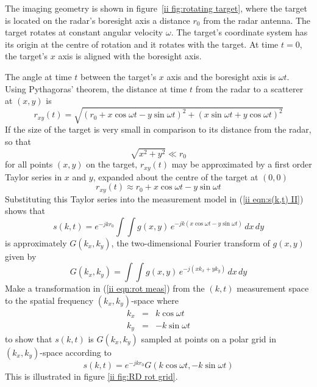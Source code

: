The imaging geometry is shown in figure~\ref{ii fig:rotating target}, where
the target is located on the radar's boresight axis a distance $r_0$ from
the radar antenna.  The target rotates at constant angular velocity
$\omega$.  The target's coordinate system has its origin at the centre of
rotation and it rotates with the target.  At time $t=0$, the target's $x$ 
axis is aligned with the boresight axis.  

The angle at time $t$ between the target's $x$ axis and the boresight axis 
is $\omega t$.  Using Pythagoras' theorem, the distance at time $t$ 
from the radar to a scatterer at $(x,y)$ is
\begin{equation}\label{ii eqn:rxy(t) rot}
r_{xy}(t)=\sqrt{(r_0+x\cos\omega t-y\sin\omega t)^2
+(x\sin\omega t+y\cos\omega t)^2}
\end{equation}
If the size of the target is very small in comparison to its distance from
the radar, so that
\begin{equation}\label{ii eqn:size condition}
\sqrt{x^2+y^2}\ll r_0
\end{equation}
for all points $(x,y)$ on the target, $r_{xy}(t)$ may be approximated by a
first order Taylor series in $x$ and $y$, expanded about the centre of the 
target at $(0,0)$
\begin{equation}\label{ii eqn:rot approx}
r_{xy}(t)\approx r_0+x\cos\omega t-y\sin\omega t
\end{equation}
Substituting this Taylor series into the measurement model in
(\ref{ii eqn:s(k,t) II}) shows that
\begin{equation}
\label{ii eqn:rot meas}
s(k,t)=e^{-jkr_0}\int\!\!\int g(x,y)\,
	e^{-jk(x\cos\omega t-y\sin\omega t)}\,dx\,dy
\end{equation}
is approximately $G(k_x,k_y)$, the two-dimensional Fourier transform 
of $g(x,y)$ given by
\begin{equation}\label{ii eqn:G(kx,ky)}
G(k_x,k_y)=\int\!\!\int g(x,y)\,e^{-j(xk_x+yk_y)}\,dx\,dy
\end{equation}
Make a transformation in (\ref{ii eqn:rot meas}) from the $(k,t)$ measurement
space to the spatial frequency $(k_x,k_y)$-space where
\begin{eqnarray}
k_x&=&k\cos\omega t \\
k_y&=&-k\sin\omega t 
\end{eqnarray}
to show that $s(k,t)$ is $G(k_x,k_y)$ sampled at points on a polar grid
in $(k_x,k_y)$-space according to
\begin{equation}
s(k,t)=e^{-jkr_0}G(k\cos\omega t,-k\sin\omega t)
\end{equation}
This is illustrated in figure \ref{ii fig:RD rot grid}.  

